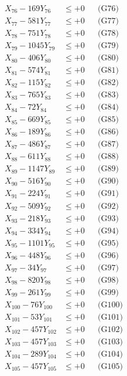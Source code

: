 \documentclass[a4paper,10pt]{article}
\begin{document}
{\begin{align}
X_{76} - 169Y_{76} &\leq +0 && \text{(G76)} \\
X_{77} - 581Y_{77} &\leq +0 && \text{(G77)} \\
X_{78} - 751Y_{78} &\leq +0 && \text{(G78)} \\
X_{79} - 1045Y_{79} &\leq +0 && \text{(G79)} \\
X_{80} - 406Y_{80} &\leq +0 && \text{(G80)} \\
\allowbreak
X_{81} - 574Y_{81} &\leq +0 && \text{(G81)} \\
X_{82} - 115Y_{82} &\leq +0 && \text{(G82)} \\
X_{83} - 765Y_{83} &\leq +0 && \text{(G83)} \\
X_{84} - 72Y_{84} &\leq +0 && \text{(G84)} \\
X_{85} - 669Y_{85} &\leq +0 && \text{(G85)} \\
X_{86} - 189Y_{86} &\leq +0 && \text{(G86)} \\
X_{87} - 486Y_{87} &\leq +0 && \text{(G87)} \\
X_{88} - 611Y_{88} &\leq +0 && \text{(G88)} \\
X_{89} - 1147Y_{89} &\leq +0 && \text{(G89)} \\
X_{90} - 516Y_{90} &\leq +0 && \text{(G90)} \\
\allowbreak
X_{91} - 224Y_{91} &\leq +0 && \text{(G91)} \\
X_{92} - 509Y_{92} &\leq +0 && \text{(G92)} \\
X_{93} - 218Y_{93} &\leq +0 && \text{(G93)} \\
X_{94} - 334Y_{94} &\leq +0 && \text{(G94)} \\
X_{95} - 1101Y_{95} &\leq +0 && \text{(G95)} \\
X_{96} - 448Y_{96} &\leq +0 && \text{(G96)} \\
X_{97} - 34Y_{97} &\leq +0 && \text{(G97)} \\
X_{98} - 820Y_{98} &\leq +0 && \text{(G98)} \\
X_{99} - 261Y_{99} &\leq +0 && \text{(G99)} \\
X_{100} - 76Y_{100} &\leq +0 && \text{(G100)} \\
\allowbreak
X_{101} - 53Y_{101} &\leq +0 && \text{(G101)} \\
X_{102} - 457Y_{102} &\leq +0 && \text{(G102)} \\
X_{103} - 457Y_{103} &\leq +0 && \text{(G103)} \\
X_{104} - 289Y_{104} &\leq +0 && \text{(G104)} \\
X_{105} - 457Y_{105} &\leq +0 && \text{(G105)} \\

\end{align}}
\end{document}
